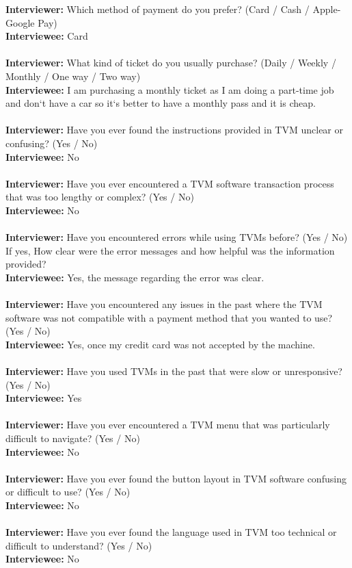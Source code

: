 \documentclass[a4paper,12pt]{report}
\begin{document}
\textbf{Interviewer:}  Which method of payment do you prefer? (Card / Cash / Apple-Google Pay)\\
\textbf{Interviewee:} Card\\\\
\textbf{Interviewer:} What kind of ticket do you usually purchase? (Daily / Weekly /  Monthly / One way / Two way) \\
\textbf{Interviewee:} I am purchasing a monthly ticket as I am doing a part-time job and don`t have a car so it`s better to have a monthly pass and it is cheap. \\\\
\textbf{Interviewer:} Have you ever found the instructions provided
in TVM unclear or confusing? (Yes / No)\\
\textbf{Interviewee:} No\\\\
\textbf{Interviewer:} Have you ever encountered a TVM software transaction process that was too lengthy or complex? (Yes / No)\\
\textbf{Interviewee:} No\\\\
\textbf{Interviewer:}  Have you encountered errors while using TVMs before? (Yes / No) If yes, How clear were the error messages and how helpful was the information provided?\\
\textbf{Interviewee:} Yes, the message regarding the error was clear.\\\\
\textbf{Interviewer:}  Have you encountered any issues in the past where the TVM software was not compatible with a payment method that you wanted to use? (Yes / No)\\
\textbf{Interviewee:} Yes, once my credit card was not accepted by the machine.\\\\
\textbf{Interviewer:}  Have you used TVMs in the past that were slow or unresponsive? (Yes / No)\\
\textbf{Interviewee:} Yes\\\\
\textbf{Interviewer:}  Have you ever encountered a TVM menu that was particularly difficult to navigate? (Yes / No)\\
\textbf{Interviewee:} No\\\\
\textbf{Interviewer:}  Have you ever found the button layout in TVM software confusing or difficult to use? (Yes / No) \\
\textbf{Interviewee:} No\\\\
\textbf{Interviewer:} Have you ever found the language used in TVM too technical or difficult to understand? (Yes / No) \\
\textbf{Interviewee:} No\\\\
\end{document}
